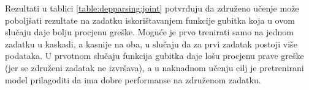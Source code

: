 Rezultati u tablici \ref{table:depparsing:joint} potvrđuju da združeno učenje
može poboljšati rezultate na zadatku iskorištavanjem funkcije gubitka koja u
ovom slučaju daje bolju procjenu greške. Moguće je prvo trenirati samo na jednom
zadatku u kaskadi, a kasnije na oba, u slučaju da za prvi zadatak postoji više
podataka. U prvotnom slučaju funkcija gubitka daje lošu procjenu prave greške
(jer se združeni zadatak ne izvršava), a u naknadnom učenju cilj je pretrenirani
model prilagoditi da ima dobre performanse na združenom zadatku.
